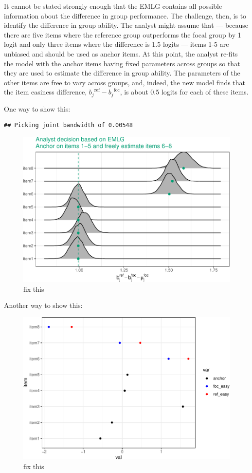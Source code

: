 \documentclass[
  11pt,
]{article}
\begin{document}
It cannot be stated strongly enough that the EMLG contains all possible information about the difference in group performance. The challenge, then, is to identify the difference in group ability. The analyst might assume that --- because there are five items where the reference group outperforms the focal group by 1 logit and only three items where the difference is 1.5 logits --- items 1-5 are unbiased and should be used as anchor items. At this point, the analyst re-fits the model with the anchor items having fixed parameters across groups so that they are used to estimate the difference in group ability. The parameters of the other items are free to vary across groups, and, indeed, the new model finds that the item easiness difference, \({b_j}^{\text{ref}} - {b_j}^{\text{foc}}\), is about 0.5 logits for each of these items.

One way to show this:

\begin{verbatim}
## Picking joint bandwidth of 0.00548
\end{verbatim}

\begin{figure}[H]

{\centering \includegraphics[width=0.7\linewidth]{paper_files/figure-latex/who-1} 

}

\caption{fix this}\label{fig:who}
\end{figure}

Another way to show this:

\begin{figure}[H]

{\centering \includegraphics[width=0.7\linewidth]{paper_files/figure-latex/why-1} 

}

\caption{fix this}\label{fig:why}
\end{figure}
\end{document}
